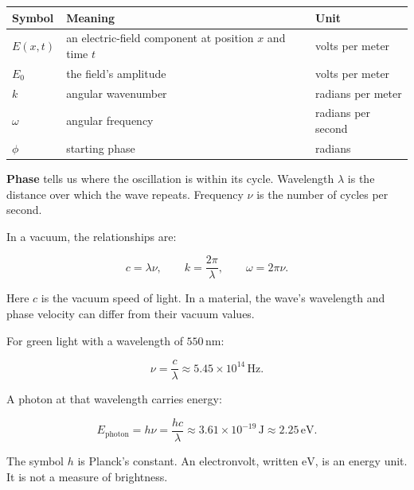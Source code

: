 {\def\LTcaptype{none} %
\begin{longtable}[]{@{}
  >{\raggedright\arraybackslash}p{}
  >{\raggedright\arraybackslash}p{}
  >{\raggedright\arraybackslash}p{}@{}}
\toprule\noalign{}
\begin{minipage}[b]{\linewidth}\raggedright
Symbol
\end{minipage} & \begin{minipage}[b]{\linewidth}\raggedright
Meaning
\end{minipage} & \begin{minipage}[b]{\linewidth}\raggedright
Unit
\end{minipage} \\
\midrule\noalign{}
\endhead
\bottomrule\noalign{}
\endlastfoot
\(E(x,t)\) & an electric-field component at position \(x\) and time \(t\) & volts per meter \\
\(E_0\) & the field's amplitude & volts per meter \\
\(k\) & angular wavenumber & radians per meter \\
\(\omega\) & angular frequency & radians per second \\
\(\phi\) & starting phase & radians \\
\end{longtable}
}

\textbf{Phase} tells us where the oscillation is within its cycle. Wavelength \(\lambda\) is the distance over which the wave repeats. Frequency \(\nu\) is the number of cycles per second.

In a vacuum, the relationships are:

\[
c=\lambda\nu,\qquad
k=\frac{2\pi}{\lambda},\qquad
\omega=2\pi\nu.
\]

Here \(c\) is the vacuum speed of light. In a material, the wave's wavelength and phase velocity can differ from their vacuum values.

For green light with a wavelength of \(550\,\mathrm{nm}\):

\[
\nu=\frac{c}{\lambda}
\approx 5.45\times10^{14}\,\mathrm{Hz}.
\]

A photon at that wavelength carries energy:

\[
E_{\mathrm{photon}}=h\nu=\frac{hc}{\lambda}
\approx 3.61\times10^{-19}\,\mathrm{J}
\approx 2.25\,\mathrm{eV}.
\]

The symbol \(h\) is Planck's constant. An electronvolt, written \(\mathrm{eV}\), is an energy unit. It is not a measure of brightness.

